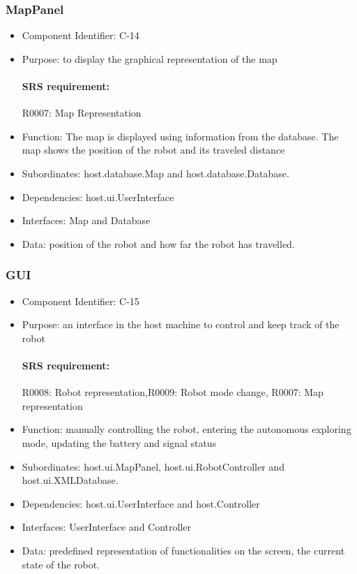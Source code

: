 \documentclass[11pt, a4paper]{report}
\begin{document}
\subsubsection{MapPanel}
\begin{itemize}
\item Component Identifier: C-14
\item Purpose: to display the graphical representation of the map
\paragraph{SRS requirement:} R0007: Map Representation
\item Function: The map is displayed using information from the database. The map shows
the position of the robot and its traveled distance
\item Subordinates: host.database.Map and host.database.Database.
\item Dependencies: host.ui.UserInterface
\item Interfaces: Map and Database
\item Data: position of the robot and how far the robot has travelled.
\end{itemize}
%

\subsubsection{GUI}
\begin{itemize}
\item Component Identifier: C-15
\item Purpose: an interface in the host machine to control and keep track of the robot
\paragraph{SRS requirement:} R0008: Robot representation,R0009: Robot mode change,
R0007: Map representation
\item Function: manually controlling the robot, entering the autonomous exploring mode, updating
the battery and signal status
\item Subordinates: host.ui.MapPanel, host.ui.RobotController and host.ui.XMLDatabase.
\item Dependencies: host.ui.UserInterface and host.Controller
\item Interfaces: UserInterface and Controller
\item Data: predefined representation of functionalities on the screen, the current state of the robot.
\end{itemize}
\end{document}
